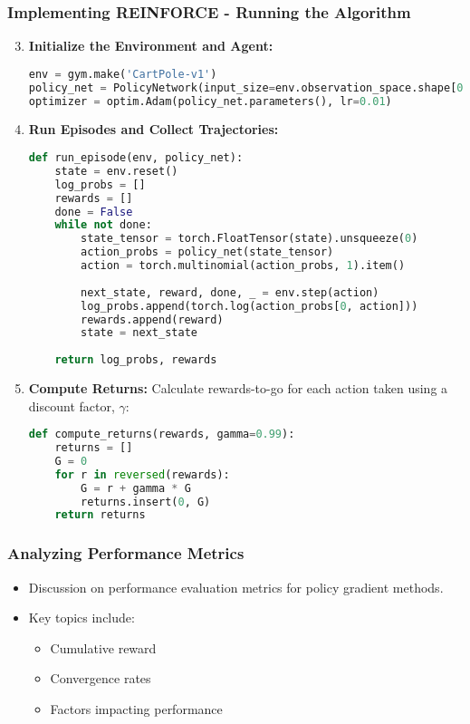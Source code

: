 \documentclass{beamer}
\begin{document}
\begin{frame}[fragile]
    \frametitle{Implementing REINFORCE - Running the Algorithm}
    \begin{enumerate}
        \setcounter{enumi}{2}
        \item \textbf{Initialize the Environment and Agent:}
        \begin{lstlisting}[language=Python]
env = gym.make('CartPole-v1')
policy_net = PolicyNetwork(input_size=env.observation_space.shape[0], output_size=env.action_space.n)
optimizer = optim.Adam(policy_net.parameters(), lr=0.01)
        \end{lstlisting}
        
        \item \textbf{Run Episodes and Collect Trajectories:}
        \begin{lstlisting}[language=Python]
def run_episode(env, policy_net):
    state = env.reset()
    log_probs = []
    rewards = []
    done = False
    while not done:
        state_tensor = torch.FloatTensor(state).unsqueeze(0)
        action_probs = policy_net(state_tensor)
        action = torch.multinomial(action_probs, 1).item()
        
        next_state, reward, done, _ = env.step(action)
        log_probs.append(torch.log(action_probs[0, action]))
        rewards.append(reward)
        state = next_state
            
    return log_probs, rewards
        \end{lstlisting}
        
        \item \textbf{Compute Returns:}
        Calculate rewards-to-go for each action taken using a discount factor, \( \gamma \):
        \begin{lstlisting}[language=Python]
def compute_returns(rewards, gamma=0.99):
    returns = []
    G = 0
    for r in reversed(rewards):
        G = r + gamma * G
        returns.insert(0, G)
    return returns
        \end{lstlisting}
    \end{enumerate}
\end{frame}

\begin{frame}
    \frametitle{Analyzing Performance Metrics}
    \begin{itemize}
        \item Discussion on performance evaluation metrics for policy gradient methods.
        \item Key topics include:
        \begin{itemize}
            \item Cumulative reward
            \item Convergence rates
            \item Factors impacting performance
        \end{itemize}
    \end{itemize}
\end{frame}
\end{document}
